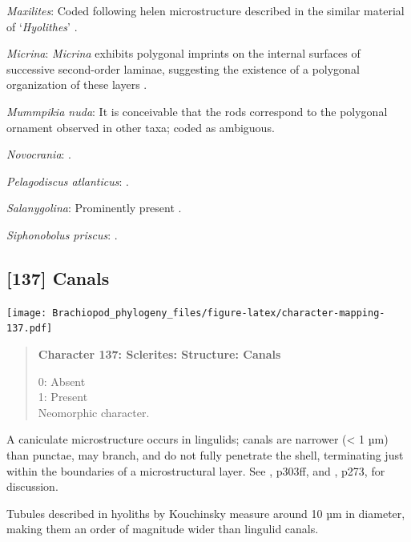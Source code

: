 \documentclass[openany]{book}
\begin{document}
\hypertarget{Maxilites-coding-136}{}
\emph{Maxilites}: Coded following helen microstructure described in the
similar material of `\emph{Hyolithes}' \citep{MartiMus2007}.

\hypertarget{Micrina-coding-136}{}
\emph{Micrina}: \emph{Micrina} exhibits polygonal imprints on the
internal surfaces of successive second-order laminae, suggesting the
existence of a polygonal organization of these layers
\citep{Balthasar2009Homologousskeletal}.

\hypertarget{Mummpikia_nuda-coding-136}{}
\emph{Mummpikia nuda}: It is conceivable that the rods
\citep{Balthasar2008iMummpikia} correspond to the polygonal ornament
observed in other taxa; coded as ambiguous.

\hypertarget{Novocrania-coding-136}{}
\emph{Novocrania}: \citet{Parkinson2005}.

\hypertarget{Pelagodiscus_atlanticus-coding-136}{}
\emph{Pelagodiscus atlanticus}: \citet{Williams1998Chemicostructural}.

\hypertarget{Salanygolina-coding-136}{}
\emph{Salanygolina}: Prominently present \citep{Holmer2009Theenigmatic}.

\hypertarget{Siphonobolus_priscus-coding-136}{}
\emph{Siphonobolus priscus}: \citep{Williams2004Chemicostructure}.

\subsection*{{[}137{]} Canals}\label{canals}

\texttt{[image: Brachiopod\_phylogeny\_files/figure-latex/character-mapping-137.pdf]}

\begin{quote}
\textbf{Character 137: Sclerites: Structure: Canals}

0: Absent\\
1: Present\\
Neomorphic character.
\end{quote}

A caniculate microstructure occurs in lingulids; canals are narrower
(\textless{} 1 µm) than punctae, may branch, and do not fully penetrate
the shell, terminating just within the boundaries of a microstructural
layer. See \citet{Williams1997Introduction}, p303ff, and
\citet{Balthasar2008iMummpikia}, p273, for discussion.

Tubules described in hyoliths by Kouchinsky
\citeyearpar{Kouchinsky2000Skeletalmicrostructures} measure around 10 µm
in diameter, making them an order of magnitude wider than lingulid
canals.
\end{document}
